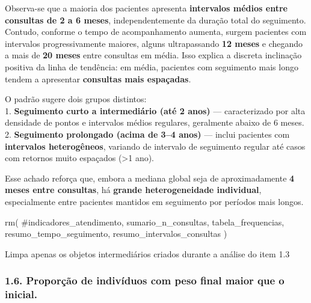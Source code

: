 \documentclass[
]{article}
\newenvironment{Shaded}{\begin{snugshade}}{\end{snugshade}}
\newcommand{\CommentTok}[1]{\textcolor[rgb]{0.37,0.37,0.37}{#1}}
\newcommand{\FunctionTok}[1]{\textcolor[rgb]{0.28,0.35,0.67}{#1}}
\newcommand{\NormalTok}[1]{\textcolor[rgb]{0.00,0.23,0.31}{#1}}
\begin{document}
Observa-se que a maioria dos pacientes apresenta \textbf{intervalos
médios entre consultas de 2 a 6 meses}, independentemente da duração
total do seguimento. Contudo, conforme o tempo de acompanhamento
aumenta, surgem pacientes com intervalos progressivamente maiores,
alguns ultrapassando \textbf{12 meses} e chegando a mais de \textbf{20
meses} entre consultas em média. Isso explica a discreta inclinação
positiva da linha de tendência: em média, pacientes com seguimento mais
longo tendem a apresentar \textbf{consultas mais espaçadas}.

O padrão sugere dois grupos distintos:\\
1. \textbf{Seguimento curto a intermediário (até 2 anos)} ---
caracterizado por alta densidade de pontos e intervalos médios
regulares, geralmente abaixo de 6 meses.\\
2. \textbf{Seguimento prolongado (acima de 3--4 anos)} --- inclui
pacientes com \textbf{intervalos heterogêneos}, variando de intervalo de
seguimento regular até casos com retornos muito espaçados (\textgreater1
ano).

Esse achado reforça que, embora a mediana global seja de aproximadamente
\textbf{4 meses entre consultas}, há \textbf{grande heterogeneidade
individual}, especialmente entre pacientes mantidos em seguimento por
períodos mais longos.

\begin{Shaded}
\begin{Highlighting}[]
\FunctionTok{rm}\NormalTok{(}
  \CommentTok{\#indicadores\_atendimento,}
\NormalTok{  sumario\_n\_consultas,}
\NormalTok{  tabela\_frequencias,}
\NormalTok{  resumo\_tempo\_seguimento,}
\NormalTok{  resumo\_intervalos\_consultas}
\NormalTok{)}
\end{Highlighting}
\end{Shaded}

Limpa apenas os objetos intermediários criados durante a análise do item
1.3

\subsubsection{1.6. Proporção de indivíduos com peso final maior que o
inicial.}\label{proporuxe7uxe3o-de-indivuxedduos-com-peso-final-maior-que-o-inicial.}
\end{document}
